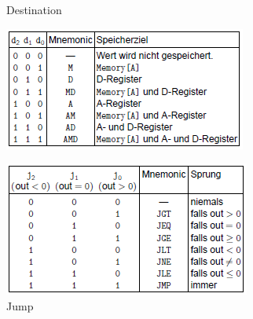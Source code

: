 \documentclass[12pt]{report}
\begin{document}
\begin{figure}[H]
  \begin{minipage}[t]{0.45\textwidth}
    \caption{Destination}
    \label{fig:maschinensprache_dest}
    \centering
    \includegraphics[width=\textwidth]{maschinensprache_dest}
  \end{minipage}
  \hfill
  \begin{minipage}[t]{0.45\textwidth}
    \caption{Jump}
    \label{fig:maschinensprache_jump}
    \centering
    \includegraphics[width=\textwidth]{maschinensprache_jump}
  \end{minipage}
\end{figure}
\end{document}
